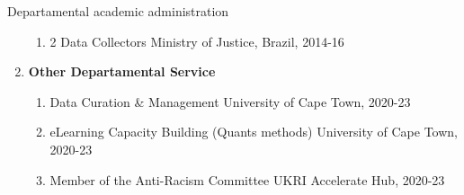 \begin{rSection}{Departamental academic administration}
\begin{enumerate}[label=\Roman*]
\begin{enumerate}[label=(\roman*)]
\item {2 Data Collectors} \hfill{Ministry of Justice, Brazil, 2014-16}
\end{enumerate}

\item {\textbf{Other Departamental Service}}
\par

\begin{enumerate}[label=(\roman*)]
\item {Data Curation \& Management} \hfill{University of Cape Town, 2020-23}

\item {eLearning Capacity Building (Quants methods)} \hfill{University of Cape Town, 2020-23}

\item {Member of the Anti-Racism Committee}  \hfill{UKRI Accelerate Hub, 2020-23}
\end{enumerate}

\end{enumerate}

\end{rSection}